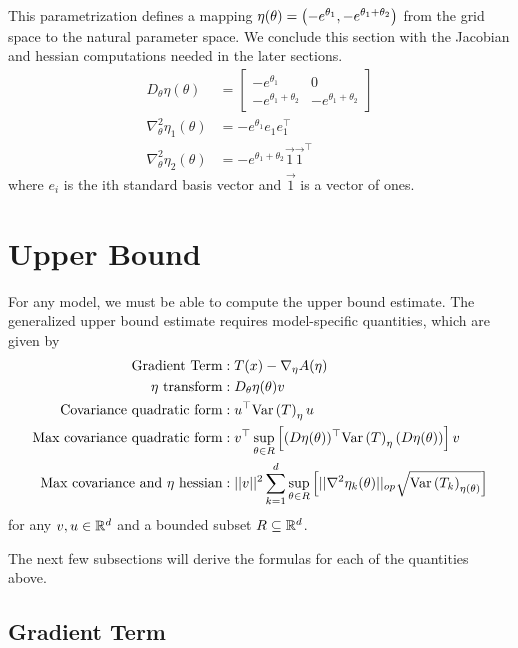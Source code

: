 \documentclass[10pt, a4paper]{article}
\begin{document}
This parametrization defines a mapping $\eta(\theta) = \left(-e^{\theta_1}, -e^{\theta_1+\theta_2}\right)$
from the grid space to the natural parameter space.
We conclude this section with the Jacobian and hessian computations
needed in the later sections.
\begin{align}
    D_\theta \eta(\theta)
    &=
    \begin{bmatrix}
        -e^{\theta_1} & 0 \\
        -e^{\theta_1+\theta_2} & -e^{\theta_1+\theta_2}
    \end{bmatrix}
    \label{eq:eta-jac}
    \\
    \nabla^2_\theta \eta_1(\theta)
    &=
    -e^{\theta_1} e_1e_1^\top 
    \label{eq:eta-1-hess}
    \\
    \nabla^2_\theta \eta_2(\theta)
    &=
    -e^{\theta_1+\theta_2} \vec{1} \vec{1}^\top
    \label{eq:eta-2-hess}
\end{align}
where $ e_i$ is the ith standard basis vector 
and $ \vec{1}$ is a vector of ones.

\section{Upper Bound}

For any model, we must be able to compute
the upper bound estimate.
The generalized upper bound estimate requires model-specific quantities,
which are given by
\begin{align*}
    \text{Gradient Term}&: T(x) - \nabla_\eta A(\eta) \\
    \text{$\eta$ transform}&: D_\theta\eta(\theta) v \\
    \text{Covariance quadratic form}&: u^\top \var{T}_{\eta} u \\
    \text{Max covariance quadratic form}&:
    v^\top \sup\limits_{\theta \in R} \bracket{(D\eta(\theta))^\top \var{T}_{\eta} (D\eta(\theta))} v \\
    \text{Max covariance and $\eta$ hessian}&: 
    \norm{v}^2
    \sum\limits_{k=1}^d
    \sup\limits_{\theta \in R}
    \bracket{%
        \norm{\nabla^2 \eta_k(\theta)}_{op}
        \sqrt{\var{T_k}_{\eta(\theta)}}
    }
\end{align*}
for any $v, u \in \mathbb{R}^d$ and a bounded subset $R \subseteq \mathbb{R}^d$.

The next few subsections will derive the formulas
for each of the quantities above.

\subsection{Gradient Term}
\end{document}
